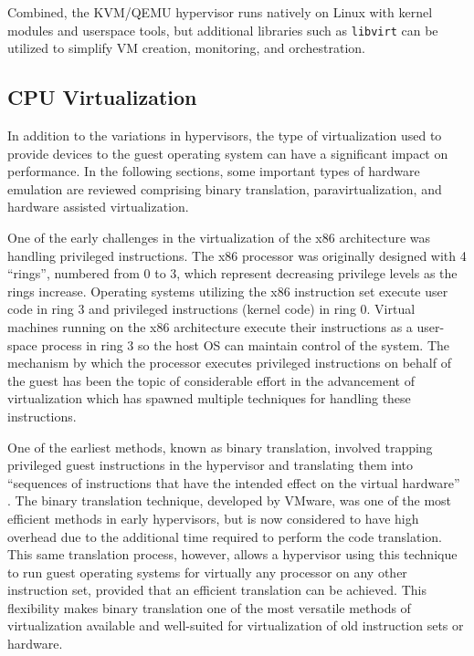 Combined, the KVM/QEMU hypervisor runs natively on Linux with kernel modules and userspace tools, but additional libraries such as \texttt{libvirt} \autocite{_libvirt_1} can be utilized to simplify VM creation, monitoring, and orchestration.


\subsection{CPU Virtualization}
\label{sec:cpuvirtualization}
In addition to the variations in hypervisors, the type of virtualization used to provide devices to the guest operating system can have a significant impact on performance.
In the following sections, some important types of hardware emulation are reviewed comprising binary translation, paravirtualization, and hardware assisted virtualization.

One of the early challenges in the virtualization of the x86 architecture was handling privileged instructions.
The x86 processor was originally designed with 4 ``rings'', numbered from 0 to 3, which represent decreasing privilege levels as the rings increase.
Operating systems utilizing the x86 instruction set execute user code in ring 3 and privileged instructions (kernel code) in ring 0.
Virtual machines running on the x86 architecture execute their instructions as a user-space process in ring 3 so the host OS can maintain control of the system.
The mechanism by which the processor executes privileged instructions on behalf of the guest has been the topic of considerable effort in the advancement of virtualization which has spawned multiple techniques for handling these instructions.

One of the earliest methods, known as binary translation, involved trapping privileged guest instructions in the hypervisor and translating them into ``sequences of instructions that have the intended effect on the virtual hardware'' \autocite{vmwareVT}.
The binary translation technique, developed by VMware, was one of the most efficient methods in early hypervisors, but is now considered to have high overhead due to the additional time required to perform the code translation.
This same translation process, however, allows a hypervisor using this technique to run guest operating systems for virtually any processor on any other instruction set, provided that an efficient translation can be achieved.
This flexibility makes binary translation one of the most versatile methods of virtualization available and well-suited for virtualization of old instruction sets or hardware.


